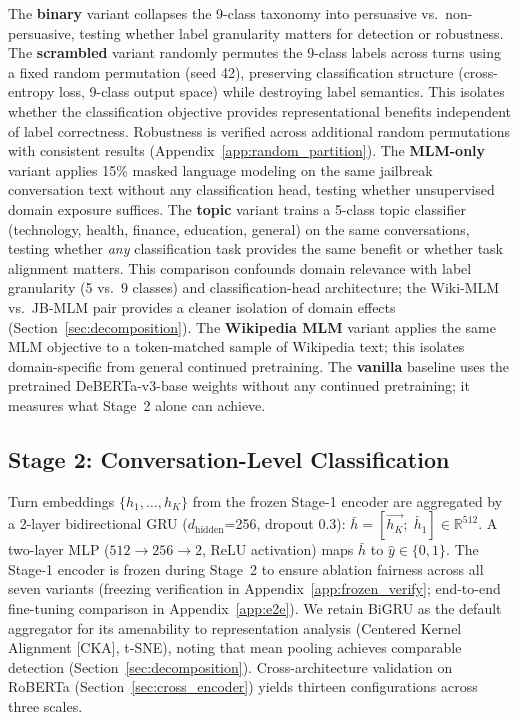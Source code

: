 The \textbf{binary} variant collapses the 9-class taxonomy into persuasive vs.\ non-persuasive, testing whether label granularity matters for detection or robustness.
The \textbf{scrambled} variant randomly permutes the 9-class labels across turns using a fixed random permutation (seed 42), preserving classification structure (cross-entropy loss, 9-class output space) while destroying label semantics. This isolates whether the classification objective provides representational benefits independent of label correctness. Robustness is verified across additional random permutations with consistent results (Appendix~\ref{app:random_partition}).
The \textbf{MLM-only} variant applies 15\% masked language modeling on the same jailbreak conversation text without any classification head, testing whether unsupervised domain exposure suffices.
The \textbf{topic} variant trains a 5-class topic classifier (technology, health, finance, education, general) on the same conversations, testing whether \emph{any} classification task provides the same benefit or whether task alignment matters. This comparison confounds domain relevance with label granularity (5 vs.\ 9 classes) and classification-head architecture; the Wiki-MLM vs.\ JB-MLM pair provides a cleaner isolation of domain effects (Section~\ref{sec:decomposition}).
The \textbf{Wikipedia MLM} variant applies the same MLM objective to a token-matched sample of Wikipedia text; this isolates domain-specific from general continued pretraining.
The \textbf{vanilla} baseline uses the pretrained DeBERTa-v3-base weights without any continued pretraining; it measures what Stage~2 alone can achieve.

\subsection{Stage 2: Conversation-Level Classification}

Turn embeddings $\{h_1, \ldots, h_K\}$ from the frozen Stage-1 encoder are aggregated by a 2-layer bidirectional GRU ($d_{\text{hidden}}$=256, dropout 0.3): $\bar{h} = [\overrightarrow{h_K};\; \overleftarrow{h_1}] \in \mathbb{R}^{512}$.
A two-layer MLP ($512 \to 256 \to 2$, ReLU activation) maps $\bar{h}$ to $\hat{y} \in \{0, 1\}$.
The Stage-1 encoder is frozen during Stage~2 to ensure ablation fairness across all seven variants (freezing verification in Appendix~\ref{app:frozen_verify}; end-to-end fine-tuning comparison in Appendix~\ref{app:e2e}).
We retain BiGRU as the default aggregator for its amenability to representation analysis (Centered Kernel Alignment [CKA], t-SNE), noting that mean pooling achieves comparable detection (Section~\ref{sec:decomposition}). Cross-architecture validation on RoBERTa (Section~\ref{sec:cross_encoder}) yields thirteen configurations across three scales.
